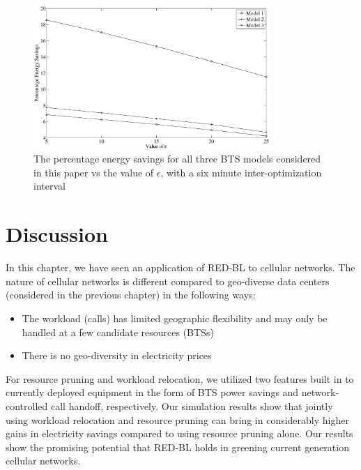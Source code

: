 \begin{figure}
\centering
\includegraphics[width=0.8\textwidth]{pics/epsilonresults.eps}
\caption{The percentage energy savings for all three BTS models considered in this paper vs the value of $\epsilon$, with a six minute inter-optimization interval}
\label{fig:case2:results6}
\end{figure}

\section{Discussion}
\label{sec:discuss:case2} In this chapter, we have seen an application of RED-BL to cellular networks. The nature of cellular networks is different compared to geo-diverse data centers (considered in the previous chapter) in the following ways:

\begin{itemize}
\item The workload (calls) has limited geographic flexibility and may only be handled at a few candidate resources (BTSs)
\item There is no geo-diversity in electricity prices
\end{itemize}

For resource pruning and workload relocation, we utilized two features built in to currently deployed equipment in the form of BTS power savings and network-controlled call handoff, respectively. Our simulation results show that jointly using workload relocation and resource pruning can bring in considerably higher gains in electricity savings compared to using resource pruning alone. Our results show the promising potential that RED-BL holds in greening current generation cellular networks.
